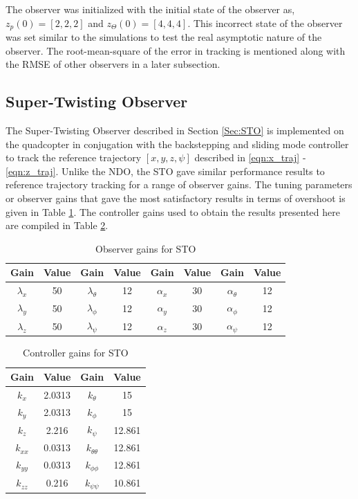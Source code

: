 \documentclass[letterpaper%
, twoside%
, 12pt%
,memoire%
, english%
,creativecommons,hyperref%
]{thETS}
\begin{document}
The observer was initialized with the initial state of the observer as, $z_p(0)=[2,2,2]$ and $z_\Theta(0)=[4,4,4]$. This incorrect state of the observer was set similar to the simulations to test the real asymptotic nature of the observer. The root-mean-square of the error in tracking is mentioned along with the RMSE of other observers in a later subsection.
\FloatBarrier

\subsection{Super-Twisting Observer}
The Super-Twisting Observer described in Section \ref{Sec:STO} is implemented on the quadcopter in conjugation with the backstepping and sliding mode controller to track the reference trajectory $[x,y,z,\psi]$ described in \eqref{eqn:x_traj} - \eqref{eqn:z_traj}. Unlike the NDO, the STO gave similar performance results to reference trajectory tracking for a range of observer gains. The tuning parameters or observer gains that gave the most satisfactory results in terms of overshoot is given in Table \ref{Tab:realSTOGains}. The controller gains used to obtain the results presented here are compiled in Table \ref{Tab:realControllerGainsSTO}. 

\begin{table}
\parbox{0.65\textwidth}{\caption{Observer gains for STO} \label{Tab:realSTOGains}} 
\begin{tabular}{|c|c|c|c|c|c|c|c|}
\hline
{\bf Gain}&{\bf Value}&{\bf Gain}&{\bf Value}&{\bf Gain}&{\bf Value}&{\bf Gain}&{\bf Value}\\ \hline
$\lambda_x$ & 50 & $\lambda_\theta$  & 12  & $\alpha_x$ & 30 & $\alpha_\theta$  & 12  \\ \hline
$\lambda_y$ & 50 & $\lambda_\phi$    & 12  & $\alpha_y$ & 30 & $\alpha_\phi$    & 12  \\ \hline
$\lambda_z$ & 50 & $\lambda_\psi$    & 12  & $\alpha_z$ & 30 & $\alpha_\psi$    & 12  \\ \hline 
\end{tabular}
\end{table}

\begin{table}
\parbox{0.65\textwidth}{\caption{Controller gains for STO}\label{Tab:realControllerGainsSTO}} 
\begin{tabular}{|c|c|c|c|}
\hline
{\bf Gain} & {\bf Value} & {\bf Gain}         & {\bf Value}  \\ \hline
$k_x$      & 2.0313      & $k_\theta$         & 15           \\ \hline
$k_y$      & 2.0313      & $k_\phi$           & 15           \\ \hline
$k_z$      & 2.216       & $k_\psi$           & 12.861       \\ \hline 
$k_{xx}$   & 0.0313      & $k_{\theta\theta}$ & 12.861       \\ \hline
$k_{yy}$   &  0.0313     & $k_{\phi\phi}$     & 12.861       \\ \hline
$k_{zz}$   & 0.216       & $k_{\psi\psi}$     & 10.861       \\ \hline 
\end{tabular}
\end{table}
\end{document}
